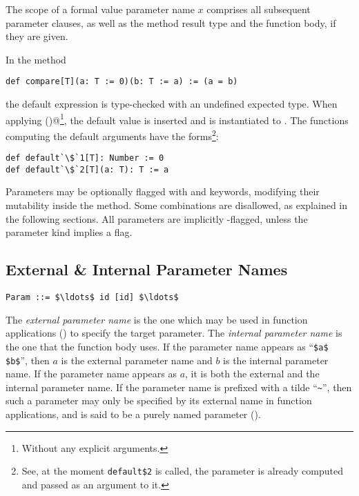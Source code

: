 The scope of a formal value parameter name $x$ comprises all subsequent parameter clauses, as well as the method result type and the function body, if they are given.

\example In the method
\begin{lstlisting}
def compare[T](a: T := 0)(b: T := a) := (a = b)
\end{lstlisting}
the default expression  is type-checked with an undefined expected type. When applying \lstinline@compare()@\footnote{Without any explicit arguments.}, the default value  is inserted and  is instantiated to . The functions computing the default arguments have the forms\footnote{See, at the moment \lstinline[mathescape=false]!default$2! is called, the parameter  is already computed and passed as an argument to it.}:
\begin{lstlisting}[escapechar=`]
def default`\$`1[T]: Number := 0
def default`\$`2[T](a: T): T := a
\end{lstlisting}

Parameters may be optionally flagged with  and  keywords, modifying their mutability inside the method. Some combinations are disallowed, as explained in the following sections. All parameters are implicitly -flagged, unless the parameter kind implies a  flag.





\subsection{External \& Internal Parameter Names}
\label{sec:external-internal-parameter-names}

\syntax\begin{lstlisting}
Param ::= $\ldots$ id [id] $\ldots$
\end{lstlisting}

The {\em external parameter name} is the one which may be used in function applications () to specify the target parameter. The {\em internal parameter name} is the one that the function body uses. If the parameter name appears as ``\lstinline!$a$ $b$!'', then $a$ is the external parameter name and $b$ is the internal parameter name. If the parameter name appears as $a$, it is both the external and the internal parameter name. If the parameter name is prefixed with a tilde ``\lstinline!~!'', then such a parameter may only be specified by its external name in function applications, and is said to be a purely named parameter (). 

